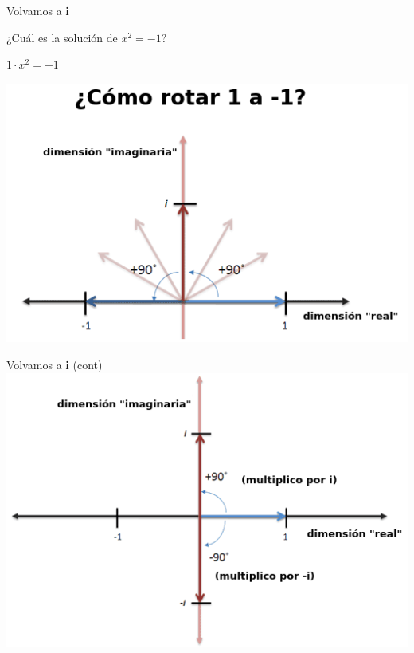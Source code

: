 \documentclass[10pt]{beamer}
\begin{document}
\begin{frame}{Volvamos a \textbf{i}}

¿Cuál es la solución de $x^2=-1$? \pause


$1\cdot x^2 = -1$


\pause

\includegraphics[scale=0.78]{rotate1m1.png}


\end{frame}


\begin{frame}{Volvamos a \textbf{i} (cont)}
	\includegraphics[scale=0.78]{rotate1m1_2.png}
	
\end{frame}
\end{document}
